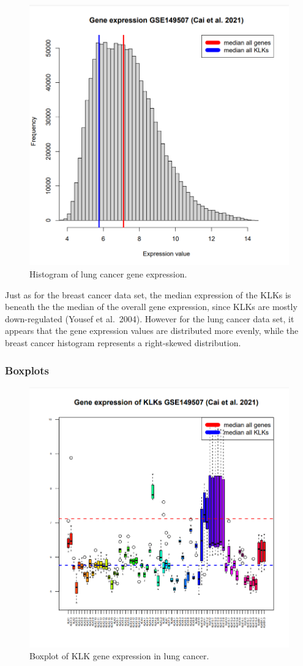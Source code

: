 \documentclass[
]{article}
\begin{document}
\begin{figure}

{\centering \includegraphics[width=0.5\linewidth]{images/Histogram_lung} 

}

\caption{Histogram of lung cancer gene expression.}\label{fig:Histogram - lung }
\end{figure}

Just as for the breast cancer data set, the median expression of the
KLKs is beneath the the median of the overall gene expression, since
KLKs are mostly down-regulated (Yousef et al.~2004). However for the
lung cancer data set, it appears that the gene expression values are
distributed more evenly, while the breast cancer histogram represents a
right-skewed distribution.

\hypertarget{boxplots-1}{%
\subsubsection{Boxplots}\label{boxplots-1}}

\begin{figure}

{\centering \includegraphics[width=0.5\linewidth]{images/Boxplot_lung} 

}

\caption{Boxplot of KLK gene expression in lung cancer.}\label{fig:Boxplot - lung }
\end{figure}
\end{document}
